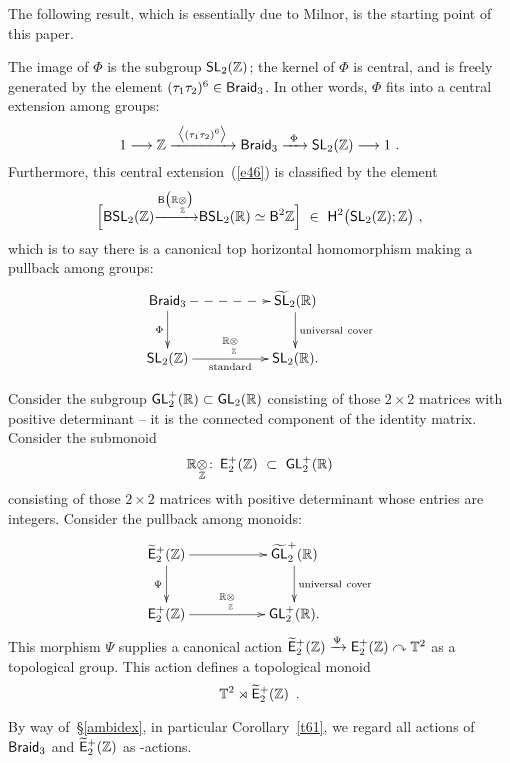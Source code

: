 The following result, which is essentially due to Milnor, is the starting point of this paper.  
\begin{prop}
\label{t32}
The image of $\Phi$ is the subgroup $\operatorname{\sf SL}_2(\mathbb Z)$; the kernel of $\Phi$ is central, and is freely generated by the element $(\tau_{1}\tau_{2})^6  \in \operatorname{{\sf Braid}_3}$.
In other words, $\Phi$ fits into a central extension among groups:
\begin{equation}
\label{e46}
1
\longrightarrow
\mathbb Z
\xrightarrow{~\bigl\langle (\tau_{1}\tau_{2})^6 \bigr\rangle~}
\operatorname{{\sf Braid}_3}
\xrightarrow{~\Phi~}
\operatorname{\sf SL}_2(\mathbb Z)
\longrightarrow  
1
~.
\end{equation}
Furthermore, this central extension~(\ref{e46}) is classified by the element
\[
\Bigl[{\sf BSL}_2(\mathbb Z) 
{\xrightarrow{\mathsf B \bigl( \mathbb R\underset{\mathbb Z}{\otimes} \bigr)}} {\sf BSL}_2(\mathbb R) \simeq \mathsf B^2 \mathbb Z
\Bigr] 
~\in~ 
\mathsf H^2\bigl( \operatorname{\sf SL}_2(\mathbb Z) ; \mathbb Z \bigr)
~,
\]
which is to say there is a canonical top horizontal homomorphism making a pullback among groups:
\[
\xymatrix{
\Braid
\ar@{-->}[rr]
\ar[d]_-{\Phi}
&&
\w{\SL}_2(\RR)  \ar[d]^-{\rm universal~cover}
\\
\SL_2(\ZZ)
\ar[rr]_-{\rm standard}^-{\RR\underset{\ZZ}\ot}
&&
\SL_2(\RR)
.
}
\]


\end{prop}






Consider the subgroup $\operatorname{\sf GL}^+_2(\mathbb R)\subset \operatorname{\sf GL}_2(\mathbb R)$ consisting of those $2\times 2$ matrices with positive determinant -- it is the connected component of the identity matrix.  
Consider the submonoid
\[
\mathbb R\underset{\mathbb Z}{\otimes}
\colon
\operatorname{\mathsf E^+_2(\mathbb Z)}
~\subset~
\operatorname{\sf GL}^+_2(\mathbb R)
\]
consisting of those $2\times 2$ matrices with positive determinant whose entries are integers.
Consider the pullback among monoids:
\begin{equation}
\label{e77}
\xymatrix{
\Ebraid
\ar[d]_-{\Psi} \ar[rr]
&&
\w{\GL}^+_2(\RR)  \ar[d]^-{\rm universal~cover}
\\
\EpZ
\ar[rr]^-{\RR \underset{\ZZ}\ot}
&&
\GL^+_2(\RR)
.
}
\end{equation}
This morphism $\Psi$ supplies a canonical action $\operatorname{\widetilde{\sf E}_{2}^{+}(\mathbb Z)} \xrightarrow{\Psi} \operatorname{\mathsf E^+_2(\mathbb Z)} \curvearrowright \mathbb T^2$ as a topological group.
This action defines a topological monoid
\[
\mathbb T^2 \rtimes \operatorname{\widetilde{\sf E}_{2}^{+}(\mathbb Z)}
~.
\]
\begin{convention}
\label{r6}
By way of~\S\ref{ambidex}, in particular Corollary~\ref{t61}, we regard all actions of $\operatorname{{\sf Braid}_3}$ and $\operatorname{\widetilde{\sf E}_{2}^{+}(\mathbb Z)}$ as -actions.  
\end{convention}





